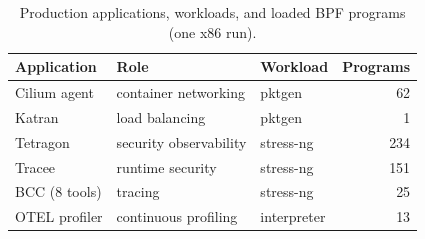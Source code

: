 \begin{table}[t]
\footnotesize
\centering
\caption{Production applications, workloads, and loaded BPF programs (one x86 run).}
\label{tab:tasks}
\begin{tabular}{lllr}
\hline
Application & Role & Workload & Programs \\
\hline
Cilium agent & container networking & pktgen & 62 \\
Katran & load balancing & pktgen & 1 \\
Tetragon & security observability & stress-ng & 234 \\
Tracee & runtime security & stress-ng & 151 \\
BCC (8 tools) & tracing & stress-ng & 25 \\
OTEL profiler & continuous profiling & interpreter & 13 \\
\hline
\end{tabular}
\end{table}
